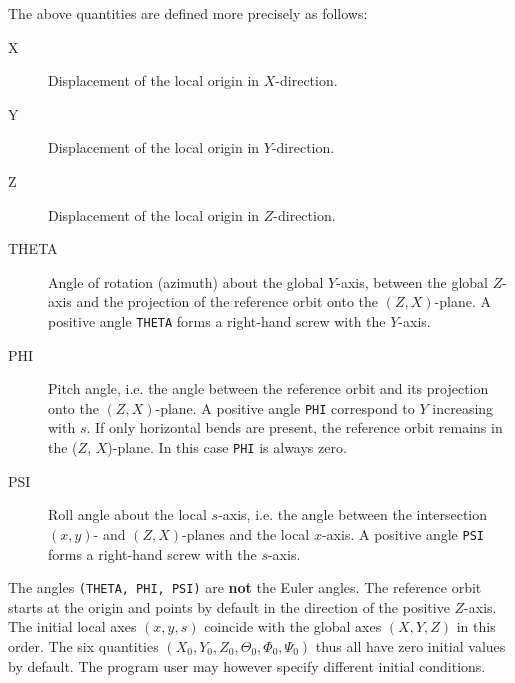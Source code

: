 The above quantities are defined more precisely as follows:
\begin{description}
\item[X]
  Displacement of the local origin in $X$-direction.
\item[Y]
  Displacement of the local origin in $Y$-direction.
\item[Z]
  Displacement of the local origin in $Z$-direction.
\item[THETA]
  Angle of rotation (azimuth) about the global $Y$-axis,
  between the global $Z$-axis and the projection
  of the reference orbit onto the $(Z, X)$-plane.
  A positive angle \texttt{THETA} forms a right-hand screw with the $Y$-axis.
\item[PHI]
  Pitch angle, i.e. the angle between the reference orbit and its projection
  onto the $(Z, X)$-plane.
  A positive angle \texttt{PHI} correspond to $Y$ increasing with $s$.
  If only horizontal bends are present,
  the reference orbit remains in the ($Z$, $X$)-plane.
  In this case \texttt{PHI} is always zero.
\item[PSI]
  Roll angle about the local $s$-axis,
  i.e. the angle between the intersection $(x, y)$- and
  $(Z, X)$-planes and the local $x$-axis.
  A positive angle \texttt{PSI} forms a right-hand screw with the $s$-axis.
\end{description}
The angles \texttt{(THETA, PHI, PSI)} are \textbf{not} the Euler angles.
The reference orbit starts at the origin and points by default
in the direction of the positive $Z$-axis.
The initial local axes $(x, y, s)$
coincide with the global axes $(X, Y, Z)$ in this order.
The six quantities $(X_0, Y_0, Z_0, \Theta_0, \Phi_0, \Psi_0)$
thus all have zero initial values by default.
The program user may however specify different initial conditions.

